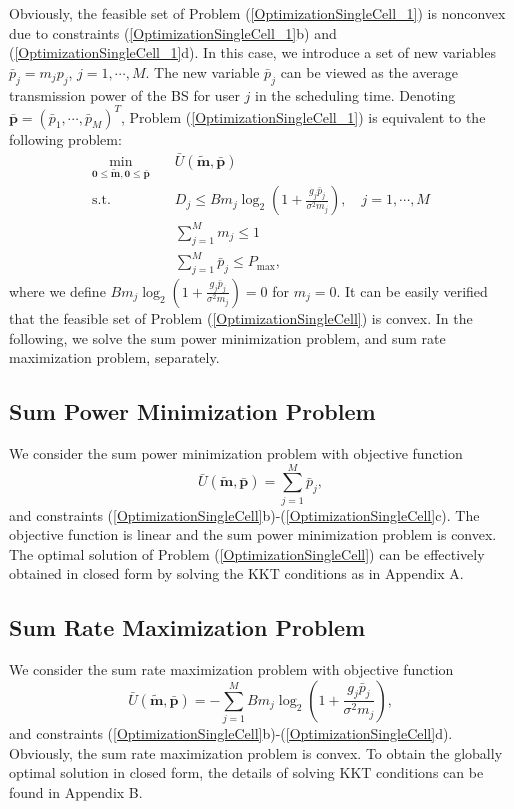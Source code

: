 \documentclass[journal]{IEEEtran}
\begin{document}
Obviously, the feasible set of Problem (\ref{OptimizationSingleCell_1}) is nonconvex due to constraints (\ref{OptimizationSingleCell_1}b) and (\ref{OptimizationSingleCell_1}d).
In this case,
we introduce a set of new variables $\bar p_j= m_j p_j$, $j=1, \cdots, M$.
The new variable $\bar p_j$ can be viewed as the average transmission power of the BS for user $j$ in the scheduling time.
Denoting $ \pmb{\bar p}=(\bar p_1, \cdots, \bar p_M)^T$, Problem (\ref{OptimizationSingleCell_1}) is equivalent to the following problem:
\begin{subequations}\label{OptimizationSingleCell}
\begin{align}
\mathop{\min}_{\pmb 0\leq \pmb{\tilde m}, \pmb 0 \leq \pmb{\bar p}} \quad\!\!\!\!
&\bar U({\pmb{\tilde m}, \pmb{\bar p}})\\
\textrm{s.t.}\qquad   \!\!\!\!\!
& D_j \!\leq\!B m_j \log_2\left(\!1\!+\!\frac{g_j \bar p_j}{\sigma^2 m_j}\!\right)\!,  \!\!\quad j \!=\!1, \cdots, M\\
&\sum_{j=1}^{M}m_j \leq 1\\
& {\sum_{j=1}^M \bar p_j} \leq P_{\max},
\end{align}
\end{subequations}
where we define $B m_j \log_2\left(1+\frac{g_j \bar p_j}{\sigma^2 m_j}\right)=0$ for $m_j=0$.
It can be easily verified that the feasible set of Problem (\ref{OptimizationSingleCell}) is convex.
In the following, we solve the sum power minimization problem, and sum rate maximization problem, separately.
\subsection{Sum Power Minimization Problem}
We consider the sum power minimization problem with objective function
\begin{equation}
\bar U({\pmb{\tilde m}, \pmb{\bar p}})={\sum_{j=1}^M \bar p_j},
\end{equation}
and constraints (\ref{OptimizationSingleCell}b)-(\ref{OptimizationSingleCell}c).
The objective function is linear and the sum power minimization problem is convex.
The optimal solution of Problem (\ref{OptimizationSingleCell}) can be effectively obtained in closed form by solving the KKT conditions as in Appendix A.

\subsection{Sum Rate Maximization Problem}
We consider the sum rate maximization problem with objective function
\begin{equation}
\bar U({\pmb{\tilde m}, \pmb{\bar p}})=-{\sum_{j=1}^M  B m_j \log_2\left(1+\frac{g_j \bar p_j}{\sigma^2 m_j}\right)},
\end{equation}
and constraints (\ref{OptimizationSingleCell}b)-(\ref{OptimizationSingleCell}d).
Obviously, the sum rate maximization problem is convex.
To obtain the globally optimal solution in closed form,
the details of solving KKT conditions can be found in Appendix B.
\end{document}
